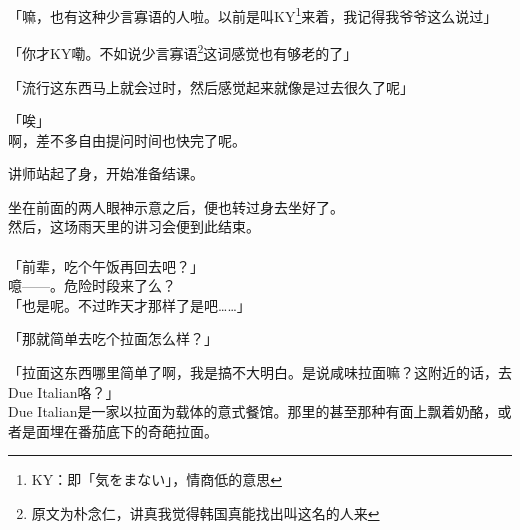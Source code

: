 「嘛，也有这种少言寡语的人啦。以前是叫KY\footnote{KY：即「気をまない」，情商低的意思}来着，我记得我爷爷这么说过」

「你才KY嘞。不如说少言寡语\footnote{原文为朴念仁，讲真我觉得韩国真能找出叫这名的人来}这词感觉也有够老的了」

「流行这东西马上就会过时，然后感觉起来就像是过去很久了呢」

「唉」\\

啊，差不多自由提问时间也快完了呢。

讲师站起了身，开始准备结课。

坐在前面的两人眼神示意之后，便也转过身去坐好了。\\

然后，这场雨天里的讲习会便到此结束。\\

\sqsplit\\

「前辈，吃个午饭再回去吧？」\\

噫——。危险时段来了么？\\

「也是呢。不过昨天才那样了是吧……」

「那就简单去吃个拉面怎么样？」

「拉面这东西哪里简单了啊，我是搞不大明白。是说咸味拉面嘛？这附近的话，去Due Italian咯？」\\

Due Italian是一家以拉面为载体的意式餐馆。那里的甚至那种有面上飘着奶酪，或者是面埋在番茄底下的奇葩拉面。\\

